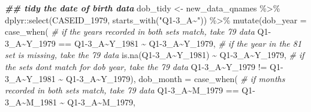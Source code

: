 \documentclass{article}
\newenvironment{Shaded}{\begin{snugshade}}{\end{snugshade}}
\newcommand{\AttributeTok}[1]{\textcolor[rgb]{0.77,0.63,0.00}{#1}}
\newcommand{\CommentTok}[1]{\textcolor[rgb]{0.56,0.35,0.01}{\textit{#1}}}
\newcommand{\DocumentationTok}[1]{\textcolor[rgb]{0.56,0.35,0.01}{\textbf{\textit{#1}}}}
\newcommand{\FunctionTok}[1]{\textcolor[rgb]{0.00,0.00,0.00}{#1}}
\newcommand{\NormalTok}[1]{#1}
\newcommand{\OtherTok}[1]{\textcolor[rgb]{0.56,0.35,0.01}{#1}}
\newcommand{\SpecialCharTok}[1]{\textcolor[rgb]{0.00,0.00,0.00}{#1}}
\newcommand{\StringTok}[1]{\textcolor[rgb]{0.31,0.60,0.02}{#1}}
\begin{document}
\begin{Shaded}
\begin{Highlighting}[]
\DocumentationTok{\#\# tidy the date of birth data}
\NormalTok{dob\_tidy }\OtherTok{\textless{}{-}}\NormalTok{ new\_data\_qnames }\SpecialCharTok{\%\textgreater{}\%}
\NormalTok{  dplyr}\SpecialCharTok{::}\FunctionTok{select}\NormalTok{(CASEID\_1979,}
         \FunctionTok{starts\_with}\NormalTok{(}\StringTok{"Q1{-}3\_A\textasciitilde{}"}\NormalTok{)) }\SpecialCharTok{\%\textgreater{}\%}
  \FunctionTok{mutate}\NormalTok{(}\AttributeTok{dob\_year =} \FunctionTok{case\_when}\NormalTok{(}
                    \CommentTok{\# if the years recorded in both sets match, take 79 data}
                    \StringTok{\textasciigrave{}}\AttributeTok{Q1{-}3\_A\textasciitilde{}Y\_1979}\StringTok{\textasciigrave{}} \SpecialCharTok{==} \StringTok{\textasciigrave{}}\AttributeTok{Q1{-}3\_A\textasciitilde{}Y\_1981}\StringTok{\textasciigrave{}} \SpecialCharTok{\textasciitilde{}} \StringTok{\textasciigrave{}}\AttributeTok{Q1{-}3\_A\textasciitilde{}Y\_1979}\StringTok{\textasciigrave{}}\NormalTok{,}
                    \CommentTok{\# if the year in the 81 set is missing, take the 79 data}
                    \FunctionTok{is.na}\NormalTok{(}\StringTok{\textasciigrave{}}\AttributeTok{Q1{-}3\_A\textasciitilde{}Y\_1981}\StringTok{\textasciigrave{}}\NormalTok{) }\SpecialCharTok{\textasciitilde{}} \StringTok{\textasciigrave{}}\AttributeTok{Q1{-}3\_A\textasciitilde{}Y\_1979}\StringTok{\textasciigrave{}}\NormalTok{,}
                    \CommentTok{\# if the sets don\textquotesingle{}t match for dob year, take the 79 data}
                    \StringTok{\textasciigrave{}}\AttributeTok{Q1{-}3\_A\textasciitilde{}Y\_1979}\StringTok{\textasciigrave{}} \SpecialCharTok{!=} \StringTok{\textasciigrave{}}\AttributeTok{Q1{-}3\_A\textasciitilde{}Y\_1981}\StringTok{\textasciigrave{}} \SpecialCharTok{\textasciitilde{}} \StringTok{\textasciigrave{}}\AttributeTok{Q1{-}3\_A\textasciitilde{}Y\_1979}\StringTok{\textasciigrave{}}\NormalTok{),}
        \AttributeTok{dob\_month =} \FunctionTok{case\_when}\NormalTok{(}
                    \CommentTok{\# if months recorded in both sets match, take 79 data}
                    \StringTok{\textasciigrave{}}\AttributeTok{Q1{-}3\_A\textasciitilde{}M\_1979}\StringTok{\textasciigrave{}} \SpecialCharTok{==} \StringTok{\textasciigrave{}}\AttributeTok{Q1{-}3\_A\textasciitilde{}M\_1981}\StringTok{\textasciigrave{}} \SpecialCharTok{\textasciitilde{}} \StringTok{\textasciigrave{}}\AttributeTok{Q1{-}3\_A\textasciitilde{}M\_1979}\StringTok{\textasciigrave{}}\NormalTok{,}

\end{Highlighting}
\end{Shaded}
\end{document}
